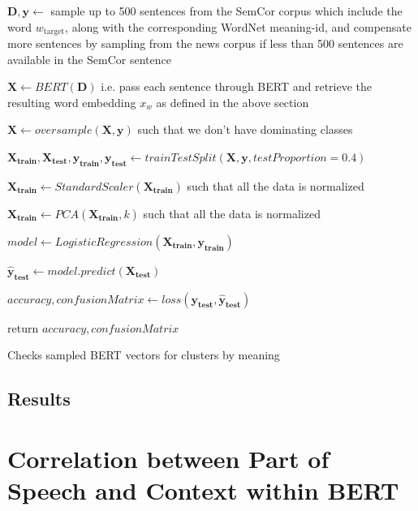 \documentclass[a4paper,12pt,twoside,openright]{report}
\begin{document}
\begin{algorithm}[H]
\SetAlgoLined
{}
 $\mathbf{D}, \mathbf{y} \leftarrow $  sample up to 500 sentences from the SemCor corpus which include the word $w_{\text{target}}$, along with the corresponding WordNet meaning-id, and compensate more sentences by sampling from the news corpus if less than 500 sentences are available in the SemCor sentence\;

$ \mathbf{X} \leftarrow BERT( \mathbf{D} )$ i.e. pass each sentence through BERT and retrieve the resulting word embedding $x_w$ as defined in the above section\;
 
$ \mathbf{X} \leftarrow oversample( \mathbf{X}, \mathbf{y} )$ such that we don't have dominating classes\;
 
$ \mathbf{X_\text{train}}, \mathbf{X_\text{test}}, \mathbf{y_\text{train}}, \mathbf{y_\text{test}} \leftarrow trainTestSplit( \mathbf{X}, \mathbf{y}, testProportion=0.4 )$ \;

$ \mathbf{X_\text{train}} \leftarrow StandardScaler( \mathbf{X_\text{train}})$ such that all the data is normalized\;

$ \mathbf{X_\text{train}} \leftarrow PCA( \mathbf{X_\text{train}}, k )$ such that all the data is normalized\;

$ model \leftarrow LogisticRegression( \mathbf{X_\text{train}}, \mathbf{y_\text{train}} )$ \;
    
$ \mathbf{\hat{y}_\text{test}} \leftarrow model.predict(\mathbf{X_\text{test}})$ \;

$ accuracy, confusionMatrix \leftarrow loss(\mathbf{y_\text{test}}, \mathbf{\hat{y}_\text{test}}) $ \;
    
return $ accuracy, confusionMatrix $\;
    
 \caption{Checks sampled BERT vectors for clusters by  meaning}
\end{algorithm}

\subsection{Results}

\section{Correlation between Part of Speech and Context within BERT}
\end{document}
